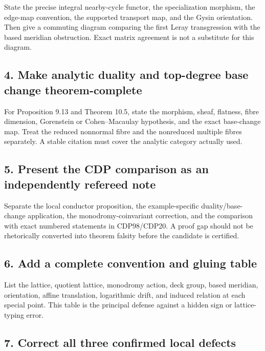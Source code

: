 \documentclass[
  10pt,
  letterpaper,
]{article}
\begin{document}
State the precise integral nearby-cycle functor, the specialization
morphism, the edge-map convention, the supported transport map, and the
Gysin orientation. Then give a commuting diagram comparing the first
Leray transgression with the based meridian obstruction. Exact matrix
agreement is not a substitute for this diagram.

\subsection{4. Make analytic duality and top-degree base change
theorem-complete}\label{make-analytic-duality-and-top-degree-base-change-theorem-complete}

For Proposition 9.13 and Theorem 10.5, state the morphism, sheaf,
flatness, fibre dimension, Gorenstein or Cohen--Macaulay hypothesis, and
the exact base-change map. Treat the reduced nonnormal fibre and the
nonreduced multiple fibres separately. A stable citation must cover the
analytic category actually used.

\subsection{5. Present the CDP comparison as an independently refereed
note}\label{present-the-cdp-comparison-as-an-independently-refereed-note}

Separate the local conductor proposition, the example-specific
duality/base-change application, the monodromy-coinvariant correction,
and the comparison with exact numbered statements in CDP98/CDP20. A
proof gap should not be rhetorically converted into theorem falsity
before the candidate is certified.

\subsection{6. Add a complete convention and gluing
table}\label{add-a-complete-convention-and-gluing-table}

List the lattice, quotient lattice, monodromy action, deck group, based
meridian, orientation, affine translation, logarithmic drift, and
induced relation at each special point. This table is the principal
defense against a hidden sign or lattice-typing error.

\subsection{7. Correct all three confirmed local
defects}\label{correct-all-three-confirmed-local-defects}
\end{document}
